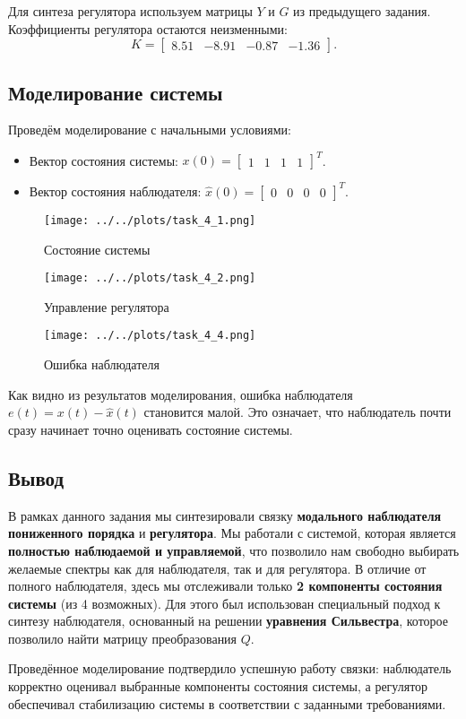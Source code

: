 Для синтеза регулятора используем матрицы $Y$ и $G$ из предыдущего задания. Коэффициенты регулятора остаются неизменными:
\[
K = \begin{bmatrix}
    8.51 & -8.91 & -0.87 & -1.36
\end{bmatrix}.
\]


\subsection{Моделирование системы}

Проведём моделирование с начальными условиями:
\begin{itemize}
    \item Вектор состояния системы: $x(0) = \begin{bmatrix} 1 & 1 & 1 & 1 \end{bmatrix}^T$.
    \item Вектор состояния наблюдателя: $\hat{x}(0) = \begin{bmatrix} 0 & 0 & 0 & 0 \end{bmatrix}^T$.
\end{itemize}

\begin{figure}[H]
    \centering
    \texttt{[image: ../../plots/task\_4\_1.png]}
    \caption{Состояние системы}
    \label{fig:task_4_state_system}
\end{figure}

\begin{figure}[H]
    \centering
    \texttt{[image: ../../plots/task\_4\_2.png]}
    \caption{Управление регулятора}
    \label{fig:task_3_control_controller}
\end{figure}

\begin{figure}[H]
    \centering
    \texttt{[image: ../../plots/task\_4\_4.png]}
    \caption{Ошибка наблюдателя}
    \label{fig:task_4_error_observer}
\end{figure}

Как видно из результатов моделирования, ошибка наблюдателя $e(t) = x(t) - \hat{x}(t)$ становится малой. Это означает, что наблюдатель почти сразу начинает точно оценивать состояние системы.


\subsection{Вывод}
В рамках данного задания мы синтезировали связку \textbf{модального наблюдателя пониженного порядка} и \textbf{регулятора}. Мы работали с системой, которая является \textbf{полностью наблюдаемой и управляемой}, что позволило нам свободно выбирать желаемые спектры как для наблюдателя, так и для регулятора. В отличие от полного наблюдателя, здесь мы отслеживали только \textbf{2 компоненты состояния системы} (из 4 возможных). Для этого был использован специальный подход к синтезу наблюдателя, основанный на решении \textbf{уравнения Сильвестра}, которое позволило найти матрицу преобразования $Q$.

Проведённое моделирование подтвердило успешную работу связки: наблюдатель корректно оценивал выбранные компоненты состояния системы, а регулятор обеспечивал стабилизацию системы в соответствии с заданными требованиями.

